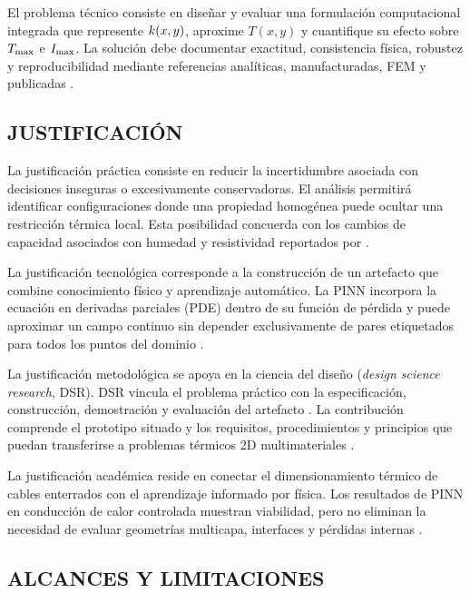 El problema técnico consiste en diseñar y evaluar una formulación computacional integrada que represente $k(x,y)$, aproxime $T(x,y)$ y cuantifique su efecto sobre $T_{\max}$ e $I_{\max}$. La solución debe documentar exactitud, consistencia física, robustez y reproducibilidad mediante referencias analíticas, manufacturadas, FEM y publicadas \parencites[3--4,93--99]{cigre2025}[4--5]{raissi2017}.

\subsection{JUSTIFICACIÓN}

La justificación práctica consiste en reducir la incertidumbre asociada con decisiones inseguras o excesivamente conservadoras. El análisis permitirá identificar configuraciones donde una propiedad homogénea puede ocultar una restricción térmica local. Esta posibilidad concuerda con los cambios de capacidad asociados con humedad y resistividad reportados por \textcite[1,6--9]{khumalo2025}.

La justificación tecnológica corresponde a la construcción de un artefacto que combine conocimiento físico y aprendizaje automático. La PINN incorpora la ecuación en derivadas parciales (PDE) dentro de su función de pérdida y puede aproximar un campo continuo sin depender exclusivamente de pares etiquetados para todos los puntos del dominio \parencites[4--5]{raissi2017}[1--3,12]{aldulaimi2024}.

La justificación metodológica se apoya en la ciencia del diseño (\textit{design science research}, DSR). DSR vincula el problema práctico con la especificación, construcción, demostración y evaluación del artefacto \parencite[55--56]{peffers2007}. La contribución comprende el prototipo situado y los requisitos, procedimientos y principios que puedan transferirse a problemas térmicos 2D multimateriales \parencite[342--350]{gregor2013}.

La justificación académica reside en conectar el dimensionamiento térmico de cables enterrados con el aprendizaje informado por física. Los resultados de PINN en conducción de calor controlada muestran viabilidad, pero no eliminan la necesidad de evaluar geometrías multicapa, interfaces y pérdidas internas \parencites[1--3,17]{xing2023}[1,3,16]{pan2025}[2--6]{ren2025}.

\subsection{ALCANCES Y LIMITACIONES}

